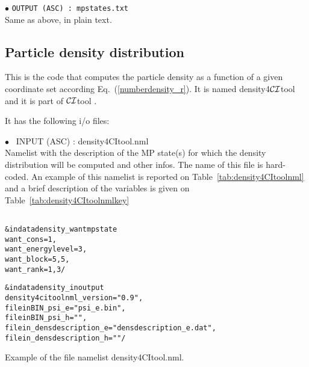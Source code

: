\documentclass[12pt,twoside]{article}
\newcommand*{\CItool}[0]{{$\cal CI$}\textsf{tool} }
\begin{document}
$\bullet$ \verb#OUTPUT (ASC) : mpstates.txt#
\\
Same as above, in plain text.



\subsection*{Particle density distribution}

This is the code that computes the particle density
as a function of a given coordinate set according Eq.~(\ref{numberdensity_r}).
It is named \textsf{density4}\CItool and it is part of \CItool.

It has the following i/o files:

$\bullet$ \ \textsf{INPUT (ASC) : density4CItool.nml} \\
Namelist with the description of the MP state(s) for which the
density distribution will be computed and other infos.
The name of this file is hard-coded.
An example of this namelist is reported on Table~\ref{tab:density4CItoolnml} and
a brief description of the variables is given on Table~\ref{tab:density4CItoolnmlkey}
%
\begin{table}
\begin{alltt}
\ \\
 &indatadensity_wantmpstate
                 want_cons= 1 ,
                 want_energylevel= 3 ,
                 want_block= 5, 5 ,
                 want_rank=  1, 3              /

 &indatadensity_inoutput
                 density4citoolnml_version= "0.9" ,
                 fileinBIN_psi_e= "psi_e.bin" ,
                 fileinBIN_psi_h= "" ,
                 filein_densdescription_e= "densdescription_e.dat" ,
                 filein_densdescription_h= ""     /
\end{alltt}
\caption{Example of the file namelist \textsf{density4CItool.nml}.} 
\label{tab:density4CItoolnml}
\end{table}
%
\end{document}
